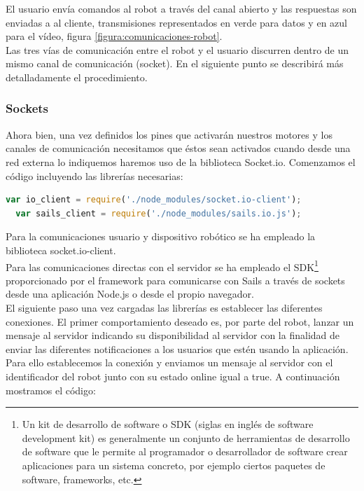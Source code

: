 El usuario envía comandos al robot a través del canal abierto y las respuestas son enviadas a al cliente, transmisiones representados en verde para datos y en azul para el vídeo, figura \ref{figura:comunicaciones-robot}.\\

Las tres vías de comunicación entre el robot y el usuario discurren dentro de un mismo canal de comunicación (socket). En el siguiente punto se describirá más detalladamente el procedimiento.


\subsubsection{Sockets}

Ahora bien, una vez definidos los pines que activarán nuestros motores y los canales de comunicación necesitamos que éstos sean activados cuando desde una red externa lo indiquemos haremos uso
de la biblioteca Socket.io. Comenzamos el código incluyendo las librerías necesarias:

\begin{lstlisting}[language=JavaScript]
  var io_client = require('./node_modules/socket.io-client');
  var sails_client = require('./node_modules/sails.io.js');
\end{lstlisting}

Para la comunicaciones usuario y dispositivo robótico se ha empleado la biblioteca socket.io-client.\\

Para las comunicaciones directas con el servidor se ha empleado el SDK\footnote{Un kit de desarrollo de software o SDK (siglas en inglés de software development kit) es generalmente un conjunto de herramientas
de desarrollo de software que le permite al programador o desarrollador de software crear aplicaciones para un sistema concreto, por ejemplo ciertos paquetes de software, frameworks, etc.} proporcionado por el framework
para comunicarse con Sails a través de sockets desde una aplicación Node.js o desde el propio navegador.\\


El siguiente paso una vez cargadas las librerías es establecer las diferentes conexiones. El primer comportamiento deseado es, por parte del robot, lanzar un mensaje al servidor indicando su disponibilidad al servidor con la finalidad de
enviar las diferentes notificaciones a los usuarios que estén usando la aplicación. Para ello establecemos la conexión y enviamos un mensaje al servidor con el identificador del robot junto con su estado online igual a true. A continuación mostramos
el código:\\

